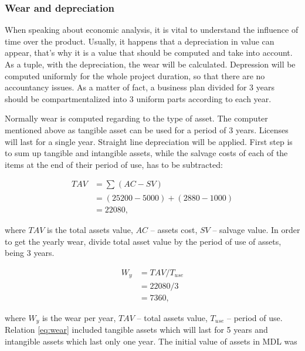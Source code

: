 \subsubsection{Wear and depreciation}
When speaking about economic analysis, it is vital to understand the influence of time over the product. Usually, it happens that a depreciation in value can appear, that's why it is a value that should be computed and take into account. As a tuple, with the depreciation, the wear will be calculated. Depression will be computed uniformly for the whole project duration, so that there are no accountancy issues. As a matter of fact, a business plan divided for 3 years should be compartmentalized into 3 uniform parts according to each year.
 

Normally wear is computed regarding to the type of asset. The computer mentioned above as tangible asset  can be used for a period of 3 years. Licenses will last for a single year. Straight line depreciation will be applied. First step is to sum up tangible and intangible assets, while the salvage costs of each of the items at the end of their period of use, has to be subtracted:

\begin{equation}
 \begin{split}
  TAV &= \sum_{} (AC - SV) \\
        &= (25200 - 5000) + (2880 - 1000) \\
        &= 22080,
 \end{split}
\end{equation}

\noindent
where $TAV$ is the total assets value, $AC$ -- assets cost, $SV$ -- salvage value.
 In order to get the yearly wear, divide total asset value by the period of use of assets, being 3 years.

\begin{equation} \label{eq:wear}
 \begin{split}
  W_y &= TAV / T_{use} \\
                &= 22080/3\\
                &= 7360,
 \end{split}
\end{equation}

\noindent
where $W_y$ is the wear per year, $TAV$ -- total assets value, $T_{use}$ -- period of use. Relation \eqref{eq:wear} included tangible assets which will last for 5 years and intangible assets which last only one year. The initial value of assets in MDL was

